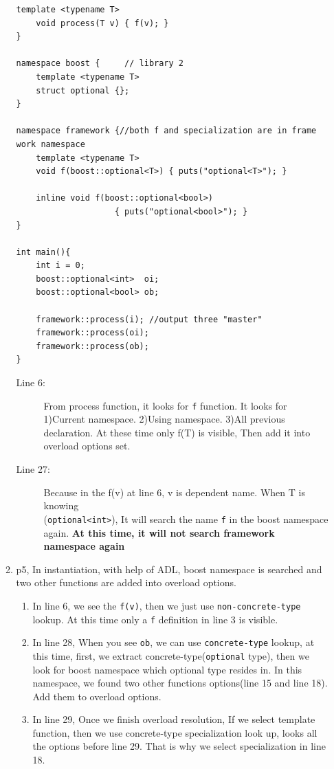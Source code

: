 \documentclass[a4paper,11pt,twoside]{book}
\begin{document}
\begin{itemize}
\begin{enumerate}
\begin{lstlisting}[]
	template <typename T>
	void process(T v) { f(v); }
}
 
namespace boost {     // library 2
	template <typename T>
	struct optional {};
}
 
namespace framework {//both f and specialization are in frame work namespace
	template <typename T>
	void f(boost::optional<T>) { puts("optional<T>"); }
    
	inline void f(boost::optional<bool>) 
	                { puts("optional<bool>"); }
}
 
int main(){
	int i = 0;
	boost::optional<int>  oi;
	boost::optional<bool> ob;
  
	framework::process(i); //output three "master"
	framework::process(oi);
	framework::process(ob);
}
\end{lstlisting}

\begin{description}
	\item[Line 6:] From process function, it looks for \texttt{f} function. It looks for 1)Current namespace. 2)Using namespace. 3)All previous declaration.
	 At these time only f(T) is visible, Then add it into overload options set.  
	 
	 \item[Line 27:] Because in the f(v) at line 6, v is dependent name. When T is knowing \\ (\texttt{optional<int>}), It will search the name \texttt{f} in the boost namespace again.  \textbf{At this time, it will not search framework namespace again}
\end{description}


\item p5, In instantiation, with help of ADL, boost namespace is searched and two other functions are added into overload options.
\begin{enumerate}
	\item In line 6, we see the \texttt{f(v)}, then we just use \texttt{non-concrete-type} lookup. At this time only a \texttt{f} definition in line 3 is visible.
	
	\item In line 28, When you see \texttt{ob}, we can use \texttt{concrete-type} lookup, at this time, first, we extract concrete-type(\texttt{optional} type), then we look for boost namespace which optional type resides in. In this namespace, we found two other functions options(line 15 and line 18). Add them to overload options. 
	
	\item In line 29, Once we finish overload resolution, If we select template function, then we use concrete-type specialization look up, looks all the options before line 29. That is why we select specialization in line 18.
\end{enumerate}	


\end{enumerate}
\end{itemize}
\end{document}
